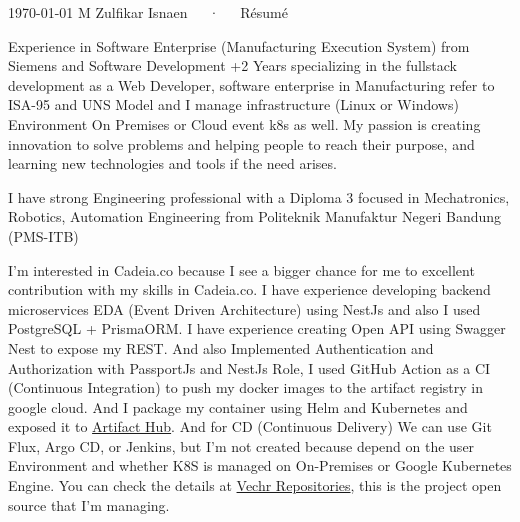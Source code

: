 \documentclass[11pt, a4paper]{awesome-cv}
\begin{document}
\makecvheader[R]

\makecvfooter
  {\today}
  {M Zulfikar Isnaen~~~·~~~Résumé}
  {}

\makelettertitle

\begin{cvletter}

Experience in Software Enterprise (Manufacturing Execution System) from Siemens and Software Development +2 Years specializing in the fullstack development as a Web Developer, software enterprise in Manufacturing refer to ISA-95 and UNS Model and I manage infrastructure (Linux or Windows) Environment On Premises or Cloud event k8s as well.
My passion is creating innovation to solve problems and helping people to reach their purpose, and learning new technologies and tools if the need arises.

I have strong Engineering professional with a Diploma 3 focused in Mechatronics, Robotics, Automation Engineering from Politeknik Manufaktur Negeri Bandung (PMS-ITB)

I'm interested in Cadeia.co because I see a bigger chance for me to excellent contribution with my skills in Cadeia.co. I have experience developing backend microservices EDA (Event Driven Architecture) using NestJs and also I used PostgreSQL + PrismaORM. I have experience creating Open API using Swagger Nest to expose my REST.
And also Implemented Authentication and Authorization with PassportJs and NestJs Role, I used GitHub Action as a CI (Continuous Integration) to push my docker images to the artifact registry in google cloud. And I package my container using Helm and Kubernetes and exposed it to \href{https://artifacthub.io/packages/helm/vechr/vechr-iiot}{Artifact Hub}.
And for CD (Continuous Delivery) We can use Git Flux, Argo CD, or Jenkins, but I'm not created because depend on the user Environment and whether K8S is managed on On-Premises or Google Kubernetes Engine. You can check the details at \href{https://github.com/orgs/vechr/repositories}{Vechr Repositories}, this is the project open source that I'm managing.


\end{cvletter}
\end{document}
